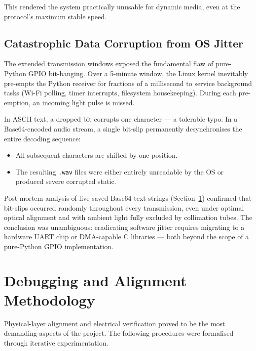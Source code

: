 \documentclass[10pt, twocolumn, a4paper]{article}
\begin{document}
This rendered the system practically unusable for dynamic media, even at the protocol's maximum stable speed.

\subsection{Catastrophic Data Corruption from OS Jitter}

The extended transmission windows exposed the fundamental flaw of pure-Python GPIO bit-banging. Over a 5-minute window, the Linux kernel inevitably pre-empts the Python receiver for fractions of a millisecond to service background tasks (Wi-Fi polling, timer interrupts, filesystem housekeeping). During each pre-emption, an incoming light pulse is missed.

In ASCII text, a dropped bit corrupts one character — a tolerable typo. In a Base64-encoded audio stream, a single bit-slip permanently desynchronises the entire decoding sequence:

\begin{itemize}[leftmargin=12pt, itemsep=1pt]
  \item All subsequent characters are shifted by one position.
  \item The resulting \texttt{.wav} files were either entirely unreadable by the OS or produced severe corrupted static.
\end{itemize}

Post-mortem analysis of live-saved Base64 text strings (Section~\ref{sec:debug}) confirmed that bit-slips occurred randomly throughout every transmission, even under optimal optical alignment and with ambient light fully excluded by collimation tubes. The conclusion was unambiguous: eradicating software jitter requires migrating to a hardware UART chip or DMA-capable C libraries — both beyond the scope of a pure-Python GPIO implementation.

\section{Debugging and Alignment Methodology}
\label{sec:debug}

Physical-layer alignment and electrical verification proved to be the most demanding aspects of the project. The following procedures were formalised through iterative experimentation.
\end{document}
